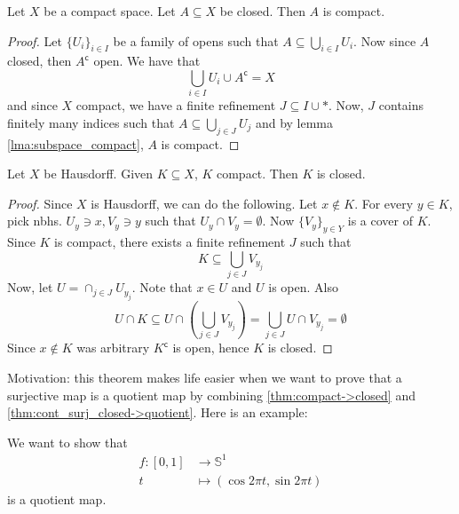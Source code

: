 \begin{theorem}
  \label{thm:compace_sub_closed}
    Let \( X \) be a compact space.
    Let \( A \subseteq X \) be closed.
    Then \( A \) is compact.
\end{theorem}

\begin{proof}
  Let \( \{ U_i \}_{i \in I}  \) be a family of opens such that
   \( A \subseteq \bigcup_{i \in I} U_i \).
    Now since \( A \) closed, then \( A^\mathsf{c} \)
    open. We have that
    \[
      \bigcup_{i \in I} U_i \cup A^\mathsf{c} = X
    \]
    and since \( X \) compact, we have a finite refinement
    \( J \subseteq I \cup *  \).
    Now, \( J \) contains finitely many indices such that
    \( A \subseteq \bigcup_{j \in J} U_j \)
    and by lemma \ref{lma:subspace_compact}, \( A \) is compact.
\end{proof}

\begin{theorem}
  \label{thm:compact->closed}
    Let \( X \) be Hausdorff.
    Given \( K \subseteq X \), \( K \) compact.
    Then \( K \) is closed.
\end{theorem}

\begin{proof}
    Since \( X \) is Hausdorff, we can do the following.
    Let \( x \notin K \).
    For every \(y \in K \),
    pick nbhs. \( U_y \ni x, V_y \ni y \)
    such that \( U_y \cap V_y = \emptyset \).
    Now \( \{ V_y \}_{y \in Y} \) is a cover of \( K \).
    Since
    \( K \) is compact, there exists a finite refinement
    \( J \) such that
    \[
      K \subseteq \bigcup_{j \in J} V_{y_j}
    \]
    Now, let \( U = \cap_{j\in J} U_{y_j} \).
    Note that \( x \in U \) and \( U \) is open.
    Also
    \[
      U \cap K \subseteq U \cap \left(\bigcup_{j \in J} V_{y_j}\right) = \bigcup_{j \in J} U \cap V_{y_j} = \emptyset
    \]
    Since \( x \notin K \) was arbitrary
    \( K^\mathsf{c} \) is open, hence \( K \) is closed.
\end{proof}

Motivation: this theorem makes life easier when we want to prove that
a surjective map is a quotient map by 
combining \ref{thm:compact->closed} and \ref{thm:cont_surj_closed->quotient}.
Here is an example:

\begin{example}
  We want to show that
  \begin{align*}
    f: [0, 1] &\longrightarrow \mathbb{S}^1 \\ t &\longmapsto (\cos 2 \pi t, \sin 2 \pi t)
  \end{align*}
  is a quotient map. 
\end{example}


